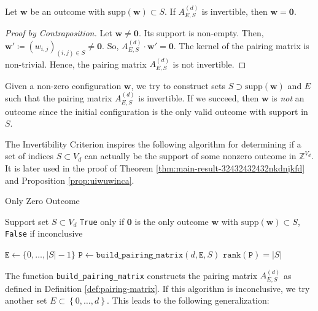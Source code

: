 \begin{proposition}
    Let \( \mathbf{w} \) be an outcome with \( \mathrm{supp}(\mathbf w) \subset S \).
    If \( A^{(d)}_{E,S} \) is invertible, then \( \mathbf{w} = \mathbf 0 \).
\end{proposition}

\begin{proof}[Proof by Contraposition]
    Let \( \mathbf{w} \neq \mathbf 0 \). Its support is non-empty. Then, \( \mathbf w' \coloneqq (w_{i,j})_{(i,j) \in S} \neq \mathbf 0 \). So, \( A^{(d)}_{E,S} \cdot \mathbf w' = \mathbf 0 \). The kernel of the pairing matrix is non-trivial. Hence, the pairing matrix \( A^{(d)}_{E,S} \) is not invertible.
\end{proof}

Given a non-zero configuration \( \mathbf{w} \), we try to construct sets \( S \supset \mathrm{supp}(\mathbf w) \) and \( E \) such that the pairing matrix \( A_{E,S}^{(d)} \) is invertible. If we succeed, then \( \mathbf{w} \) is \emph{not} an outcome since the initial configuration is the only valid outcome with support in \( S \). 


The Invertibility Criterion inspires the following algorithm for determining if a set of indices \( S \subset V_d \) can actually be the support of some nonzero outcome in \( \mathbb{Z}^{V_d} \). It is later used in the proof of Theorem \ref{thm:main-result-32432432432nkdnjkfd} and Proposition \ref{prop:uiwuwinca}.

\begin{algorithm}[H]
\caption{Only Zero Outcome}\label{alg:hyperfield_criterion:is_zero}
    \begin{algorithmic}[1]
    \Require Support set $S \subset {V_d}$
    \Ensure \texttt{True} only if \( \mathbf{0} \) is the only outcome \( \mathbf{w} \) with \( \mathrm{supp}(\mathbf{w}) \subset S \), \texttt{False} if inconclusive

    \State $\texttt{E} \gets \{0, \dots, |{S}| - 1\}$
    \State $\texttt{P} \gets \texttt{build\_pairing\_matrix}(d, \texttt{E}, S)$    
    \State \Return $\texttt{rank}(\texttt{P}) = |S|$
    \end{algorithmic}  
\end{algorithm}

The function \texttt{build\_pairing\_matrix} constructs the pairing matrix \( A^{(d)}_{E,S} \) as defined in Definition \ref{def:pairing-matrix}. If this algorithm is inconclusive, we try another set \( E \subset \left\{ 0, \dots, d \right\} \). This leads to the following generalization:

